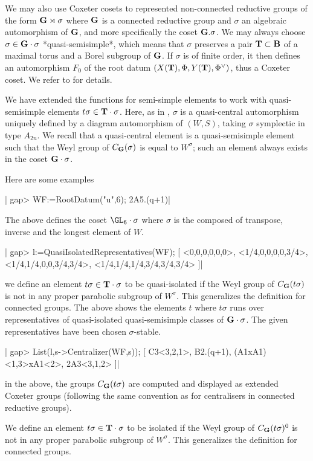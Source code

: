 We  may  also  use  Coxeter  cosets  to represented non-connected reductive
groups  of the form ${\bf G}\rtimes\sigma$ where ${\bf G}$ is a connected reductive
group   and  $\sigma$  an   algebraic  automorphism  of   ${\bf G}$,  and  more
specifically the coset ${\bf G}.\sigma$. We may always choose
$\sigma\in{\bf G}\cdot\sigma$  *quasi-semisimple*,  which  means  that $\sigma$
preserves a pair ${\bf T}\subset{\bf B}$ of a maximal torus and a Borel subgroup of
${\bf G}$.  If $\sigma$  is of  finite order,  it then  defines an automorphism
$F_0$ of the root datum $(X({\bf T}), \Phi, Y({\bf T}), \Phi^\vee)$, thus a Coxeter
coset. We refer to \cite{ss} for details.

We  have  extended  the  functions  for  semi-simple  elements to work with
quasi-semisimple   elements   $t\sigma\in{\bf T}\cdot\sigma$.   Here,   as   in
\cite{ss},  $\sigma$ is a quasi-central  automorphism uniquely defined by a
diagram  automorphism  of  $(W,S)$,  taking  $\sigma$  symplectic  in  type
$A_{2n}$.  We  recall  that  a  quasi-central element is a quasi-semisimple
element such that the Weyl group of $C_{\bf G}(\sigma)$ is equal to $W^\sigma$;
such an element always exists in the coset ${\bf G}\cdot\sigma$.

Here are some examples\:

|    gap> WF:=RootDatum("u",6);
    2A5.(q+1)|

The above defines the coset $\GL_6\cdot\sigma$ where $\sigma$ is the composed
of transpose, inverse and the longest element of $W$.

|    gap> l:=QuasiIsolatedRepresentatives(WF);
    [ <0,0,0,0,0,0>, <1/4,0,0,0,0,3/4>, <1/4,1/4,0,0,3/4,3/4>, 
      <1/4,1/4,1/4,3/4,3/4,3/4> ]|

we define an element $t\sigma\in{\bf T}\cdot\sigma$ to be quasi-isolated if the
Weyl  group of $C_{\bf G}(t\sigma)$ is not  in any proper parabolic subgroup of
$W^\sigma$. This generalizes the definition for connected groups. The above
shows  the  elements  $t$  where  $t\sigma$  runs  over  representatives of
quasi-isolated  quasi-semisimple  classes  of  ${\bf G}\cdot\sigma$.  The given
representatives have been chosen $\sigma$-stable.

|    gap> List(l,s->Centralizer(WF,s));
    [ C3<3,2,1>, B2.(q+1), (A1xA1)<1,3>xA1<2>, 2A3<3,1,2> ]|

in  the above,  the groups  $C_{\bf G}(t\sigma)$ are  computed and displayed as
extended  Coxeter groups (following the same convention as for centralisers
in connected reductive groups).

We  define an element $t\sigma\in{\bf T}\cdot\sigma$ to be isolated if the Weyl
group  of $C_{\bf G}(t\sigma)^0$  is not  in any  proper parabolic  subgroup of
$W^\sigma$. This generalizes the definition for connected groups.

